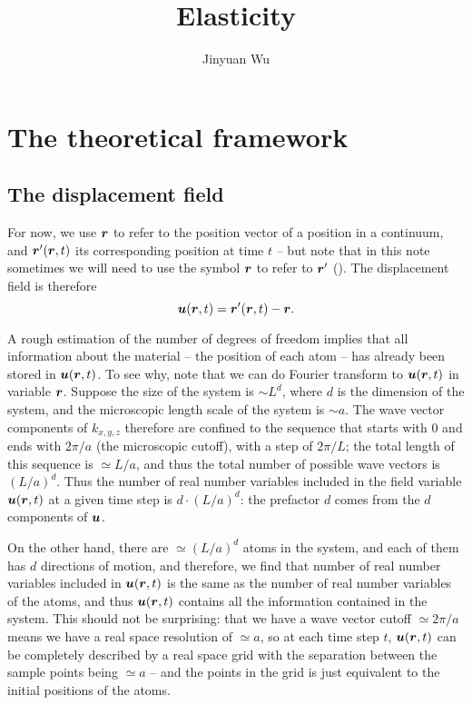 \documentclass[hyperref, a4paper]{article}
\title{Elasticity}
\author{Jinyuan Wu}
\begin{document}
\maketitle

\section{The theoretical framework}

\subsection{The displacement field}

For now, we use $\vb*{r}$ to refer to the position vector of a position in a continuum,
and $\vb*{r}'(\vb*{r}, t)$ its corresponding position at time $t$ -- 
but note that in this note sometimes
we will need to use the symbol $\vb*{r}$ to refer to $\vb*{r}'$ 
().
The displacement field is therefore 
\begin{equation}
    \vb*{u}(\vb*{r}, t) = \vb*{r}'(\vb*{r}, t) - \vb*{r}.
\end{equation}

A rough estimation of the number of degrees of freedom 
implies that all information about the material -- the position of each atom -- 
has already been stored in $\vb*{u}(\vb*{r}, t)$.
To see why, note that we can do Fourier transform to $\vb*{u}(\vb*{r}, t)$ 
in variable $\vb*{r}$.
Suppose the size of the system is $\sim L^d$,
where $d$ is the dimension of the system,
and the microscopic length scale of the system is $\sim a$.
The wave vector components of $k_{x, y, z}$ therefore are
confined to the sequence that starts with $0$ and ends with $2\pi / a$ 
(the microscopic cutoff),
with a step of $2\pi / L$;
the total length of this sequence is $\simeq L / a$,
and thus the total number of possible wave vectors is $(L / a)^d$.
Thus the number of real number variables included in the field variable $\vb*{u}(\vb*{r}, t)$ 
at a given time step 
is $d \cdot (L / a)^d$:
the prefactor $d$ comes from the $d$ components of $\vb*{u}$.

On the other hand, there are $\simeq (L / a)^d$ atoms in the system,
and each of them has $d$ directions of motion,
and therefore, we find that number of real number variables included in $\vb*{u}(\vb*{r}, t)$
is the same as the number of real number variables of the atoms,
and thus $\vb*{u}(\vb*{r}, t)$ contains all the information contained in the system.
This should not be surprising:
that we have a wave vector cutoff $\simeq 2\pi /a$ 
means we have a real space resolution of $\simeq a$,
so at each time step $t$, $\vb*{u}(\vb*{r}, t)$ 
can be completely described by a real space grid with 
the separation between the sample points being $\simeq a$ -- 
and the points in the grid is just equivalent to the initial positions of the atoms.
\end{document}
